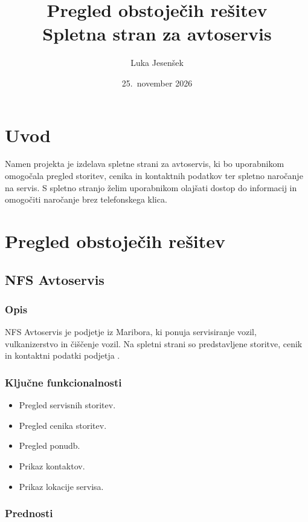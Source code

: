\documentclass[a4paper,11pt]{article}
\title{Pregled obstoječih rešitev\\
Spletna stran za avtoservis}
\author{Luka Jesenšek}
\date{25.\ november 2026}
\begin{document}
\maketitle
\tableofcontents
\newpage

\section{Uvod}

Namen projekta je izdelava spletne strani za avtoservis, ki bo uporabnikom omogočala pregled storitev, cenika in kontaktnih podatkov ter spletno naročanje na servis. S spletno stranjo želim uporabnikom olajšati dostop do informacij in omogočiti naročanje brez telefonskega klica.

\section{Pregled obstoječih rešitev}

\subsection{NFS Avtoservis}

\subsubsection{Opis}

NFS Avtoservis je podjetje iz Maribora, ki ponuja servisiranje vozil, vulkanizerstvo in čiščenje vozil. Na spletni strani so predstavljene storitve, cenik in kontaktni podatki podjetja \cite{nfs}.

\subsubsection{Ključne funkcionalnosti}

\begin{itemize}
    \item Pregled servisnih storitev.
    \item Pregled cenika storitev.
    \item Pregled ponudb.
    \item Prikaz kontaktov.
    \item Prikaz lokacije servisa.
\end{itemize}

\subsubsection{Prednosti}
\end{document}
